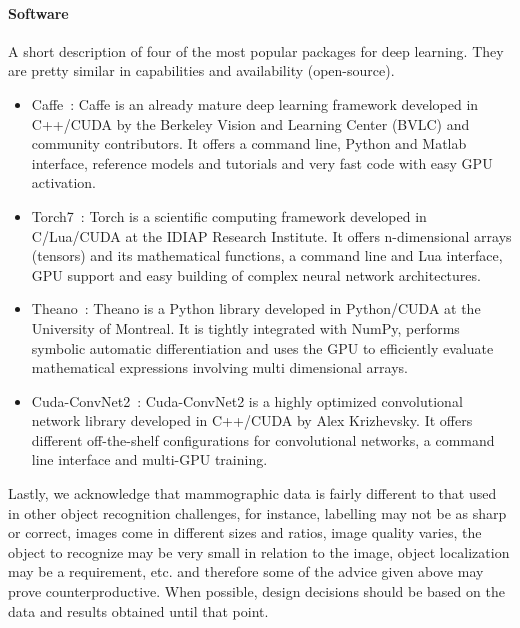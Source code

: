 \paragraph{Software}A short description of four of the most popular packages for deep learning. They are pretty similar in capabilities and availability (open-source).

\begin{itemize}
	\item Caffe~\cite{Jia2014}: Caffe is an already mature deep learning framework developed in C++/CUDA by the Berkeley Vision and Learning Center (BVLC) and community contributors. It offers a command line, Python and Matlab interface, reference models and tutorials and very fast code with easy GPU activation.
	\item Torch7~\cite{Collobert2011}: Torch is a scientific computing framework developed in C/Lua/CUDA at the IDIAP Research Institute. It offers n-dimensional arrays (tensors) and its mathematical functions, a command line and Lua interface, GPU support and easy building of complex neural network architectures.
	\item Theano~\cite{Bergstra2010, Bastien2012}: Theano is a Python library developed in Python/CUDA at the University of Montreal. It is tightly integrated with NumPy, performs symbolic automatic differentiation and uses the GPU to efficiently evaluate mathematical expressions involving multi dimensional arrays.
	\item Cuda-ConvNet2~\cite{Krizhevsky2014}: Cuda-ConvNet2 is a highly optimized convolutional network library developed in C++/CUDA by Alex Krizhevsky. It offers different off-the-shelf configurations for convolutional networks, a command line interface and multi-GPU training.
\end{itemize}

\bigskip

Lastly, we acknowledge that mammographic data is fairly different to that used in other object recognition challenges, for instance, labelling may not be as sharp or correct, images come in different sizes and ratios, image quality varies, the object to recognize may be very small in relation to the image, object localization may be a requirement, etc. and therefore some of the advice given above may prove counterproductive. When possible, design decisions should be based on the data and results obtained until that point.


